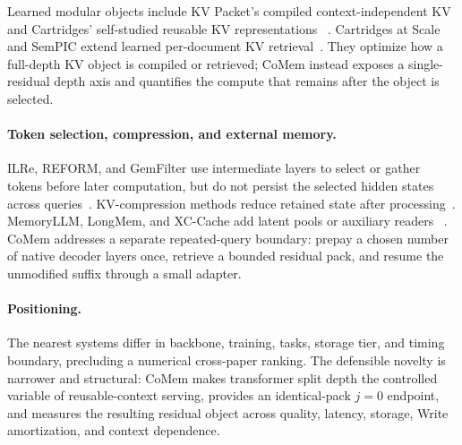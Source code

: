 Learned modular objects include KV Packet's compiled context-independent KV and
Cartridges' self-studied reusable KV representations
~\citep{kvpacket,cartridgesbase}. Cartridges at Scale and SemPIC extend learned
per-document KV retrieval~\citep{cartridges,sempic}. They optimize how a
full-depth KV object is compiled or retrieved; CoMem instead exposes a
single-residual depth axis and quantifies the compute that remains after the
object is selected.

\paragraph{Token selection, compression, and external memory.}
ILRe, REFORM, and GemFilter use intermediate layers to select or gather tokens
before later computation, but do not persist the selected hidden states across
queries~\citep{ilre,reform,gemfilter}. KV-compression methods reduce retained
state after processing~\citep{streamingllm,h2o,snapkv,pyramidkv,minicache}.
MemoryLLM, LongMem, and XC-Cache add latent pools or auxiliary readers
~\citep{memoryllm,longmem,xccache}. CoMem addresses a separate repeated-query
boundary: prepay a chosen number of native decoder layers once, retrieve a
bounded residual pack, and resume the unmodified suffix through a small
adapter.

\paragraph{Positioning.}
The nearest systems differ in backbone, training, tasks, storage tier, and
timing boundary, precluding a numerical cross-paper ranking. The defensible
novelty is narrower and structural: CoMem makes transformer split depth the
controlled variable of reusable-context serving, provides an identical-pack
$j{=}0$ endpoint, and measures the resulting residual object across quality,
latency, storage, Write amortization, and context dependence.
